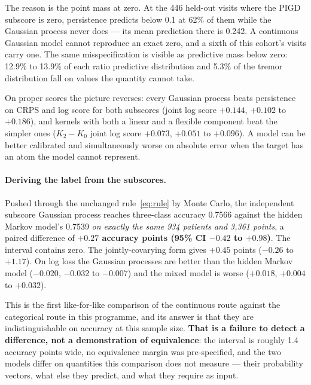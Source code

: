 \documentclass[11pt]{article}
\begin{document}
The reason is the point mass at zero. At the 446 held-out visits where the PIGD
subscore is zero, persistence predicts below 0.1 at 62\% of them while the
Gaussian process never does --- its mean prediction there is 0.242. A continuous
Gaussian model cannot reproduce an exact zero, and a sixth of this cohort's visits
carry one. The same misspecification is visible as predictive mass below zero:
12.9\% to 13.9\% of each ratio predictive distribution and 5.3\% of the tremor
distribution fall on values the quantity cannot take.

On proper scores the picture reverses: every Gaussian process beats persistence
on CRPS and log score for both subscores (joint log score $+0.144$, $+0.102$ to
$+0.186$), and kernels with both a linear and a flexible component beat the
simpler ones ($K_2 - K_0$ joint log score $+0.073$, $+0.051$ to $+0.096$). A
model can be better calibrated and simultaneously worse on absolute error when the
target has an atom the model cannot represent.

\paragraph{Deriving the label from the subscores.}
Pushed through the unchanged rule~\eqref{eq:rule} by Monte Carlo, the independent
subscore Gaussian process reaches three-class accuracy 0.7566 against the hidden
Markov model's 0.7539 \emph{on exactly the same 934 patients and 3,361 points},
a paired difference of \textbf{$+0.27$ accuracy points (95\% CI $-0.42$ to
$+0.98$)}. The interval contains zero. The jointly-covarying form gives $+0.45$
points ($-0.26$ to $+1.17$). On log loss the Gaussian processes are better than
the hidden Markov model ($-0.020$, $-0.032$ to $-0.007$) and the mixed model is
worse ($+0.018$, $+0.004$ to $+0.032$).

This is the first like-for-like comparison of the continuous route against the
categorical route in this programme, and its answer is that they are
indistinguishable on accuracy at this sample size. \textbf{That is a failure to
detect a difference, not a demonstration of equivalence}: the interval is roughly
1.4 accuracy points wide, no equivalence margin was pre-specified, and the two
models differ on quantities this comparison does not measure --- their probability
vectors, what else they predict, and what they require as input.
\end{document}
